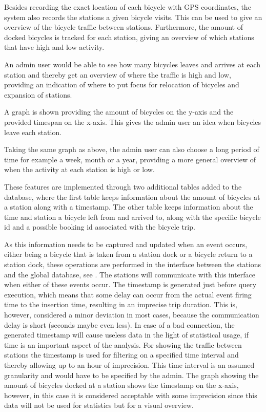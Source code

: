 Besides recording the exact location of each bicycle with GPS coordinates, the system also records the stations a given bicycle visits. 
This can be used to give an overview of the bicycle traffic between stations.
Furthermore, the amount of docked bicycles is tracked for each station, giving an overview of which stations that have high and low activity.

\begin{description}[style=nextline]
\item[Where is the most traffic of bicycles during some period?] An admin user would be able to see how many bicycles leaves and arrives at each station and thereby get an overview of where the traffic is high and low, providing an indication of where to put focus for relocation of bicycles and expansion of stations.
\item[What is the current amount of bicycles at a given station?] A graph is shown providing the amount of bicycles on the y-axis and the provided timespan on the x-axis. This gives the admin user an idea when bicycles leave each station.
\item[How does the amount of bicycles at a given station change over time?] Taking the same graph as above, the admin user can also choose a long period of time for example a week, month or a year, providing a more general overview of when the activity at each station is high or low.
\end{description}

These features are implemented through two additional tables added to the database, where the first table keeps information about the amount of bicycles at a station along with a timestamp. 
The other table keeps information about the time and station a bicycle left from and arrived to, along with the specific bicycle id and a possible booking id associated with the bicycle trip.

As this information needs to be captured and updated when an event occurs, either being a bicycle that is taken from a station dock or a bicycle return to a station dock, these operations are performed in the interface between the stations and the global database, see . 
The stations will communicate with this interface when either of these events occur. 
The timestamp is generated just before query execution, which means that some delay can occur from the actual event firing time to the insertion time, resulting in an imprecise trip duration. 
This is, however, considered a minor deviation in most cases, because the communication delay is short (seconds maybe even less).
In case of a bad connection, the generated timestamp will cause useless data in the light of statistical usage, if time is an important aspect of the analysis.
For showing the traffic between stations the timestamp is used for filtering on a specified time interval and thereby allowing up to an hour of imprecision.
This time interval is an assumed granularity and would have to be specified by the admin.
The graph showing the amount of bicycles docked at a station shows the timestamp on the x-axis, however, in this case it is considered acceptable with some imprecision since this data will not be used for statistics but for a visual overview.